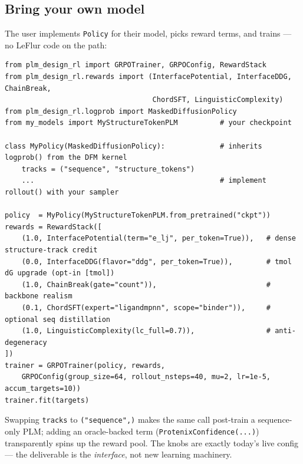 \documentclass[11pt]{article}
\newcommand{\ttk}[1]{\texttt{\small #1}}
\begin{document}
\subsection{Bring your own model}
The user implements \ttk{Policy} for their model, picks reward terms, and trains --- no LeFlur code
on the path:
\begin{verbatim}
from plm_design_rl import GRPOTrainer, GRPOConfig, RewardStack
from plm_design_rl.rewards import (InterfacePotential, InterfaceDDG, ChainBreak,
                                   ChordSFT, LinguisticComplexity)
from plm_design_rl.logprob import MaskedDiffusionPolicy
from my_models import MyStructureTokenPLM          # your checkpoint

class MyPolicy(MaskedDiffusionPolicy):             # inherits logprob() from the DFM kernel
    tracks = ("sequence", "structure_tokens")
    ...                                            # implement rollout() with your sampler

policy  = MyPolicy(MyStructureTokenPLM.from_pretrained("ckpt"))
rewards = RewardStack([
    (1.0, InterfacePotential(term="e_lj", per_token=True)),   # dense structure-track credit
    (0.0, InterfaceDDG(flavor="ddg", per_token=True)),        # tmol dG upgrade (opt-in [tmol])
    (1.0, ChainBreak(gate="count")),                          # backbone realism
    (0.1, ChordSFT(expert="ligandmpnn", scope="binder")),     # optional seq distillation
    (1.0, LinguisticComplexity(lc_full=0.7)),                 # anti-degeneracy
])
trainer = GRPOTrainer(policy, rewards,
    GRPOConfig(group_size=64, rollout_nsteps=40, mu=2, lr=1e-5, accum_targets=10))
trainer.fit(targets)
\end{verbatim}
Swapping \ttk{tracks} to \ttk{("sequence",)} makes the same call post-train a sequence-only PLM;
adding an oracle-backed term (\ttk{ProtenixConfidence(...)}) transparently spins up the reward pool.
The knobs are exactly today's live config --- the deliverable is the \emph{interface}, not new
learning machinery.
\end{document}
